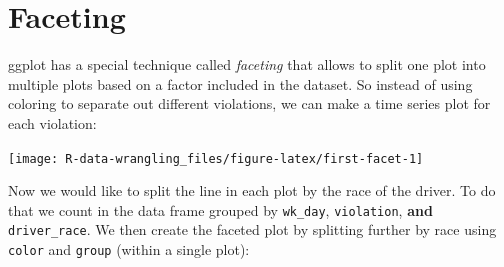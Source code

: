 \documentclass[]{book}
\newenvironment{Shaded}{\begin{snugshade}}{\end{snugshade}}
\newcommand{\CommentTok}[1]{\textcolor[rgb]{0.56,0.35,0.01}{\textit{#1}}}
\newcommand{\DataTypeTok}[1]{\textcolor[rgb]{0.13,0.29,0.53}{#1}}
\newcommand{\KeywordTok}[1]{\textcolor[rgb]{0.13,0.29,0.53}{\textbf{#1}}}
\newcommand{\NormalTok}[1]{#1}
\newcommand{\OperatorTok}[1]{\textcolor[rgb]{0.81,0.36,0.00}{\textbf{#1}}}
\newcommand{\StringTok}[1]{\textcolor[rgb]{0.31,0.60,0.02}{#1}}
\begin{document}
\hypertarget{faceting}{%
\section{Faceting}\label{faceting}}

ggplot has a special technique called \emph{faceting} that allows to split one plot
into multiple plots based on a factor included in the dataset. So instead of using coloring to separate out different violations, we can make a time series plot for each violation:

\begin{Shaded}
\end{Shaded}

\texttt{[image: R-data-wrangling\_files/figure-latex/first-facet-1]}

Now we would like to split the line in each plot by the race of the driver. To do that we count in the data frame grouped by \texttt{wk\_day}, \texttt{violation}, \textbf{and} \texttt{driver\_race}. We then create the faceted plot by splitting further by race using \texttt{color} and \texttt{group} (within a single plot):

\begin{Shaded}
\end{Shaded}
\end{document}
